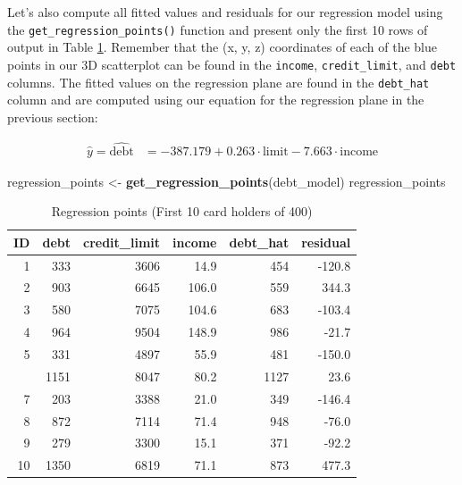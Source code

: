 \documentclass[12pt, krantz2,]{krantz}
\makeatletter
\newenvironment{Shaded}{\begin{snugshade}}{\end{snugshade}}
\newcommand{\KeywordTok}[1]{\textcolor[rgb]{0.27,0.27,0.27}{\textbf{#1}}}
\newcommand{\NormalTok}[1]{#1}
\newcommand{\StringTok}[1]{\textcolor[rgb]{0.5,0.5,0.5}{#1}}
\newenvironment{kframe}{%
\medskip{}
\setlength{\fboxsep}{.8em}
 \def\at@end@of@kframe{}%
 \ifinner\ifhmode%
  \def\at@end@of@kframe{\end{minipage}}%
  \begin{minipage}{\columnwidth}%
 \fi\fi%
 \def\FrameCommand##1{\hskip\@totalleftmargin \hskip-\fboxsep
 \colorbox{shadecolor}{##1}\hskip-\fboxsep
     \hskip-\linewidth \hskip-\@totalleftmargin \hskip\columnwidth}%
 \MakeFramed {\advance\hsize-\width
   \@totalleftmargin\z@ \linewidth\hsize
   \@setminipage}}%
 {\par\unskip\endMakeFramed%
 \at@end@of@kframe}
\renewenvironment{Shaded}{\begin{kframe}}{\end{kframe}}
\makeatother
\begin{document}
Let's also compute all fitted values and residuals for our regression model using the \texttt{get\_regression\_points()} function and present only the first 10 rows of output in Table \ref{tab:model3-points-table}. Remember that the (x, y, z) coordinates of each of the blue points in our 3D scatterplot can be found in the \texttt{income}, \texttt{credit\_limit}, and \texttt{debt} columns. The fitted values on the regression plane are found in the \texttt{debt\_hat} column and are computed using our equation for the regression plane in the previous section:

\[
\begin{aligned}
\widehat{y} = \widehat{\text{debt}} &= -387.179 + 0.263 \cdot \text{limit} - 7.663 \cdot \text{income}
\end{aligned}
\]

\begin{Shaded}
\begin{Highlighting}[]
\NormalTok{regression_points <-}\StringTok{ }\KeywordTok{get_regression_points}\NormalTok{(debt_model)}
\NormalTok{regression_points}
\end{Highlighting}
\end{Shaded}

\begin{table}[H]

\caption{\label{tab:model3-points-table}Regression points (First 10 card holders of 400)}
\centering
\fontsize{10}{12}\selectfont
\begin{tabular}{rrrrrr}
\toprule
ID & debt & credit\_limit & income & debt\_hat & residual\\
\midrule
1 & 333 & 3606 & 14.9 & 454 & -120.8\\
2 & 903 & 6645 & 106.0 & 559 & 344.3\\
3 & 580 & 7075 & 104.6 & 683 & -103.4\\
4 & 964 & 9504 & 148.9 & 986 & -21.7\\
5 & 331 & 4897 & 55.9 & 481 & -150.0\\
\addlinespace
6 & 1151 & 8047 & 80.2 & 1127 & 23.6\\
7 & 203 & 3388 & 21.0 & 349 & -146.4\\
8 & 872 & 7114 & 71.4 & 948 & -76.0\\
9 & 279 & 3300 & 15.1 & 371 & -92.2\\
10 & 1350 & 6819 & 71.1 & 873 & 477.3\\
\bottomrule
\end{tabular}
\end{table}
\end{document}

